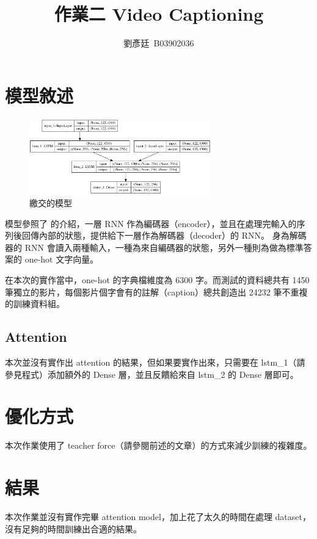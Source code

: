 \documentclass[final,3p]{elsarticle}
\begin{document}
\begin{frontmatter}

\title{作業二 Video Captioning}

\author{劉彥廷~B03902036}

\end{frontmatter}


\section{模型敘述}
	\begin{figure}[H]
		\centering
		\includegraphics[width=0.7\textwidth]{images/model}
		\caption{繳交的模型} \label{fig:model}
	\end{figure}
	
	模型參照了 \cite{Atenminu59:online} 的介紹，一層 RNN 作為編碼器（encoder），並且在處理完輸入的序列後回傳內部的狀態，提供給下一層作為解碼器（decoder）的 RNN。
	身為解碼器的 RNN 會讀入兩種輸入，一種為來自編碼器的狀態，另外一種則為做為標準答案的 one-hot 文字向量。
	
	在本次的實作當中，one-hot 的字典檔維度為 6300 字。而測試的資料總共有 1450 筆獨立的影片，每個影片個字會有的註解（caption）總共創造出 24232 筆不重複的訓練資料組。
	
	\subsection{Attention}
	本次並沒有實作出 attention 的結果，但如果要實作出來，只需要在 lstm\_1（請參見程式）添加額外的 Dense 層，並且反饋給來自 lstm\_2 的 Dense 層即可。
			
\section{優化方式}
	本次作業使用了 teacher force（請參閱前述的文章）的方式來減少訓練的複雜度。
		
\section{結果}
	本次作業並沒有實作完畢 attention model，加上花了太久的時間在處理 dataset，沒有足夠的時間訓練出合適的結果。
		
\end{document}
